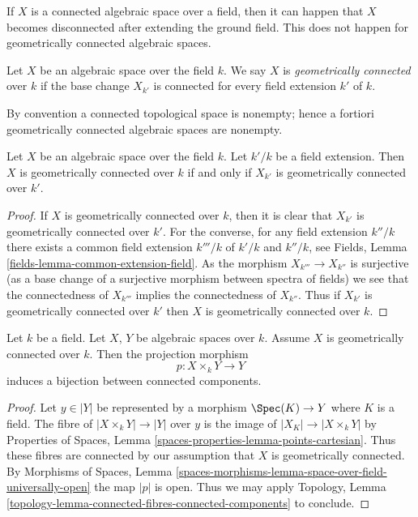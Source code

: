 \noindent
If $X$ is a connected algebraic space over a field, then it can happen that
$X$ becomes disconnected after extending the ground field. This does not
happen for geometrically connected algebraic spaces.

\begin{definition}
\label{definition-geometrically-connected}
Let $X$ be an algebraic space over the field $k$. We say $X$ is
{\it geometrically connected} over $k$ if the base change $X_{k'}$
is connected for every field extension $k'$ of $k$.
\end{definition}

\noindent
By convention a connected topological space is nonempty; hence a fortiori
geometrically connected algebraic spaces are nonempty.

\begin{lemma}
\label{lemma-geometrically-connected-check-after-extension}
Let $X$ be an algebraic space over the field $k$.
Let $k'/k$ be a field extension.
Then $X$ is geometrically connected over $k$ if and only if
$X_{k'}$ is geometrically connected over $k'$.
\end{lemma}

\begin{proof}
If $X$ is geometrically connected over $k$, then it is clear that
$X_{k'}$ is geometrically connected over $k'$. For the converse,
for any field extension $k''/k$ there exists a common
field extension $k'''/k$ of $k'/k$ and $k''/k$, see
Fields, Lemma \ref{fields-lemma-common-extension-field}. As the
morphism $X_{k'''} \to X_{k''}$ is surjective (as a base change of
a surjective morphism between spectra of fields) we see that the
connectedness of $X_{k'''}$ implies the connectedness of $X_{k''}$.
Thus if $X_{k'}$ is geometrically connected over $k'$ then
$X$ is geometrically connected over $k$.
\end{proof}

\begin{lemma}
\label{lemma-bijection-connected-components}
Let $k$ be a field. Let $X$, $Y$ be algebraic spaces over $k$.
Assume $X$ is geometrically connected over $k$.
Then the projection morphism
$$
p : X \times_k Y \longrightarrow Y
$$
induces a bijection between connected components.
\end{lemma}

\begin{proof}
Let $y \in |Y|$ be represented by a morphism $\Spec(K) \to Y$
where $K$ is a field. The fibre of $|X \times_k Y| \to |Y|$ over $y$
is the image of $|X_K| \to |X \times_k Y|$ by
Properties of Spaces, Lemma \ref{spaces-properties-lemma-points-cartesian}.
Thus these fibres are connected by our assumption that $X$ is
geometrically connected. By
Morphisms of Spaces, Lemma
\ref{spaces-morphisms-lemma-space-over-field-universally-open}
the map $|p|$ is open.
Thus we may apply Topology,
Lemma \ref{topology-lemma-connected-fibres-connected-components}
to conclude.
\end{proof}

